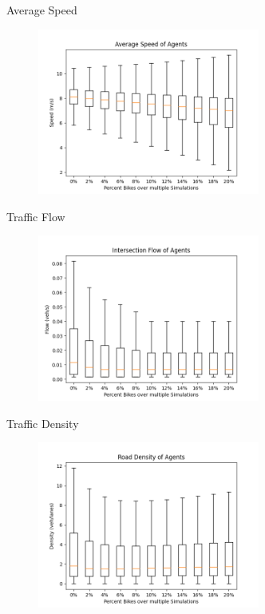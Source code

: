 \begin{frame}{Average Speed}
        \vspace{-0.2cm}
        \begin{figure}
		\includegraphics[width=0.65\textwidth]{Images/avg_speed_agent.png}
	\end{figure}
\end{frame}

\begin{frame}{Traffic Flow}
\vspace{-0.2cm}
        \begin{figure}
		\includegraphics[width=0.65\textwidth]{Images/intersection_flow_agent.png}
	\end{figure}
\end{frame}

\begin{frame}{Traffic Density}
\vspace{-0.2cm}
        \begin{figure}
		\includegraphics[width=0.65\textwidth]{Images/road_density_agent.png}
	\end{figure}
\end{frame}